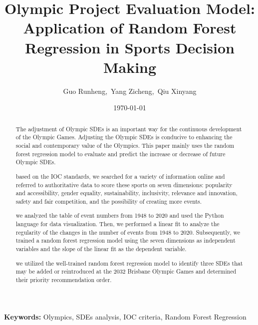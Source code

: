 \documentclass[a4paper]{article}
\title{\textbf{Olympic Project Evaluation Model: Application of Random Forest Regression in Sports Decision Making}}
\author{ Guo Runheng,\ Yang Zicheng,\ Qiu Xinyang}
\date{\today}
\newcommand{\keywords}[1]{\par\noindent\textbf{Keywords:} #1}
\begin{document}
    \maketitle
\begin{abstract}
    The adjustment of Olympic SDEs is an important way for the continuous development of the Olympic Games. Adjusting the Olympic SDEs is conducive to enhancing the social and contemporary value of the Olympics. This paper mainly uses the random forest regression model to evaluate and predict the increase or decrease of future Olympic SDEs.
    \par based on the IOC standards, we searched for a variety of information online and referred to authoritative data to score these sports on seven dimensions: popularity and accessibility, gender equality, sustainability, inclusivity, relevance and innovation, safety and fair competition, and the possibility of creating more events.
    \par we analyzed the table of event numbers from 1948 to 2020 and used the Python language for data visualization. Then, we performed a linear fit to analyze the regularity of the changes in the number of events from 1948 to 2020. Subsequently, we trained a random forest regression model using the seven dimensions as independent variables and the slope of the linear fit as the dependent variable.
    \par we utilized the well-trained random forest regression model to identify three SDEs that may be added or reintroduced at the 2032 Brisbane Olympic Games and determined their priority recommendation order.
\end{abstract}
\keywords{Olympics, SDEs analysis, IOC criteria, Random Forest Regression}
\end{document}
